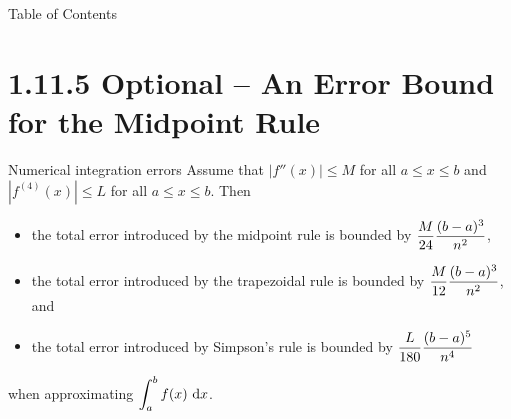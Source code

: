 



 \begin{frame}{Table of Contents }
\mapofcontentsA{\ak,\atool}
 \end{frame}

\section{1.11.5  Optional -- An Error Bound for the Midpoint Rule}
\begin{frame}[t,label=statement]
\begin{block}{Numerical integration errors}
Assume that $|f''(x)|\le M$ for all $a \le x \le b$ and $|f^{(4)}(x)|\le L$ for all $a \le x \le b$. Then
\begin{itemize}
\item\alert{the total error introduced by the midpoint rule is bounded by $\displaystyle\frac{M}{24}\frac{(b-a)^3}{n^2}$, }
\item the total error introduced by the trapezoidal rule is bounded by $\displaystyle\frac{M}{12}\frac{(b-a)^3}{n^2}$, and 
\item the total error introduced by Simpson's rule is bounded by $\displaystyle\frac{L}{180}\frac{(b-a)^5}{n^4}$ 
\end{itemize}
when approximating $\displaystyle\int_a^b f(x)\ \text{d} x$.
\end{block}
\end{frame}
